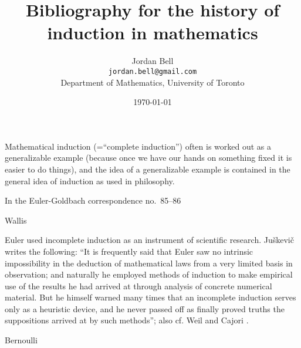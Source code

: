 \documentclass{article}
\theoremstyle{definition}
\begin{document}
\title{Bibliography for the history of induction in mathematics}
\author{Jordan Bell\\ \texttt{jordan.bell@gmail.com}\\Department of Mathematics, University of Toronto}
\date{\today}


\maketitle

Mathematical induction (=``complete induction'') often is worked out as a generalizable example (because once we have our hands on something fixed it is easier to do things),
and the idea of a generalizable example is contained in the general idea of induction as used in philosophy.

In the Euler-Goldbach correspondence no.~85--86

Wallis \cite[p.~474]{wallisIV}

Euler used incomplete induction as
an instrument of scientific research.
Ju{\v s}kevi{\v c} \cite{eulerdsb} writes
the following:
``It is frequently said that Euler saw no intrinsic impossibility in
the deduction of mathematical laws from a very limited basis in
observation; and naturally he employed methods of induction to
make empirical use of the results he had arrived at through analysis
of concrete numerical material. But he himself warned many times that an
incomplete induction serves only as a heuristic device, and he never
passed off as finally proved truths the suppositions arrived at by
such methods''; also cf. Weil \cite[Chapter II, \S III]{weil}
and
Cajori \cite{cajori}.

Bernoulli \cite[p.~29]{bernoulli2}

\nocite{*}



\end{document}
